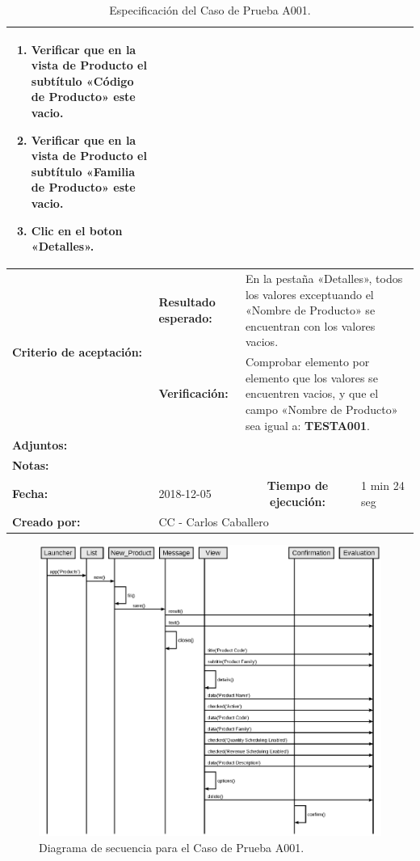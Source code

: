 \begin{table}[H]
\begin{tabular}{|p{2.5cm}|p{2.5cm}|p{2.8cm}|p{2.5cm}|p{2.6cm}|}
{{\begin{enumerate}
\item Verificar que en la vista de Producto el subtítulo «Código de Producto» este vacio.
\item Verificar que en la vista de Producto el subtítulo «Familia de Producto» este vacio.
\item Clic en el boton «Detalles».
\end{enumerate}
}} \\
\hline
\multirow{2}{2.8cm}{\footnotesize{\textbf{Criterio de aceptación:}}} &
\footnotesize{\textbf{Resultado esperado:}} &
\multicolumn{3}{p{9.1cm}|}{\footnotesize{En la pestaña «Detalles», todos los
valores exceptuando el «Nombre de Producto» se encuentran con los valores
vacios.}} \\
\cline{2-5}
& \footnotesize{\textbf{Verificación:}} &
\multicolumn{3}{p{9.1cm}|}{\footnotesize{Comprobar elemento por elemento que los
valores se encuentren vacios, y que el campo «Nombre de Producto» sea igual a:
\textbf{TESTA001}.}} \\
\hline
\footnotesize{\textbf{Adjuntos:}} &
\multicolumn{4}{p{12.4cm}|}{\footnotesize{}} \\
\hline
\footnotesize{\textbf{Notas:}} &
\multicolumn{4}{p{12.4cm}|}{\footnotesize{}} \\
\hline
\footnotesize{\textbf{Fecha:}} & \footnotesize{2018-12-05} & \multicolumn{2}{c|}{\footnotesize{\textbf{Tiempo de ejecución:}}} & \footnotesize{1 min 24 seg} \\
\hline
\footnotesize{\textbf{Creado por:}} &
\multicolumn{4}{p{12.4cm}|}{\footnotesize{CC - Carlos Caballero}} \\
\hline
\end{tabular}
\caption{Especificación del Caso de Prueba A001.}
\label{lltc}
\end{table}

\begin{figure}[H]
\centering
\includegraphics[width=1.0\textwidth]{graphics/diagram02.eps}
\caption{Diagrama de secuencia para el Caso de Prueba A001.}
\label{sequence}
\end{figure}


